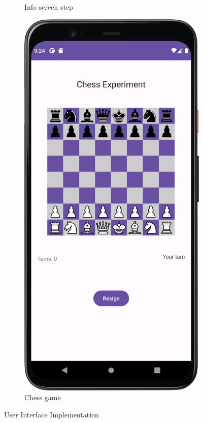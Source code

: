 \begin{figure}[htbp]
\begin{subfigure}[b]{0.25\textwidth}
        \caption{Info screen step}
        \label{subfig:InfoScreen2}
    \end{subfigure}
    \hspace{1cm}
    \begin{subfigure}[b]{0.25\textwidth}
        \centering
        \includegraphics[width=\textwidth]{content/06_demonstration_of_the_artifact/Screenshot_Chess.png}
        \caption{Chess game}
        \label{subfig:ChessGame}
    \end{subfigure}
    \caption{User Interface Implementation}
    \label{fig:uiScreens}
\end{figure}

